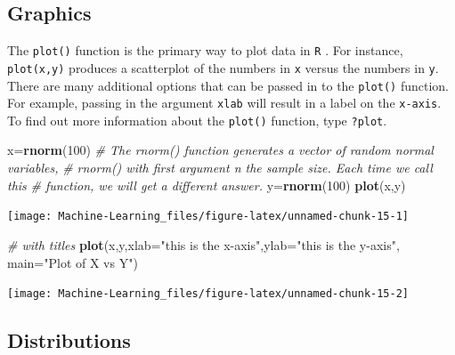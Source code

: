 \documentclass[]{book}
\newenvironment{Shaded}{\begin{snugshade}}{\end{snugshade}}
\newcommand{\KeywordTok}[1]{\textcolor[rgb]{0.13,0.29,0.53}{\textbf{{#1}}}}
\newcommand{\DataTypeTok}[1]{\textcolor[rgb]{0.13,0.29,0.53}{{#1}}}
\newcommand{\DecValTok}[1]{\textcolor[rgb]{0.00,0.00,0.81}{{#1}}}
\newcommand{\StringTok}[1]{\textcolor[rgb]{0.31,0.60,0.02}{{#1}}}
\newcommand{\CommentTok}[1]{\textcolor[rgb]{0.56,0.35,0.01}{\textit{{#1}}}}
\newcommand{\NormalTok}[1]{{#1}}
\begin{document}
\subsection{Graphics}\label{graphics}

The \texttt{plot()} function is the primary way to plot data in
\texttt{R} . For instance, \texttt{plot(x,y)} produces a scatterplot of
the numbers in \texttt{x} versus the numbers in \texttt{y}. There are
many additional options that can be passed in to the \texttt{plot()}
function. For example, passing in the argument \texttt{xlab} will result
in a label on the \texttt{x-axis}. To find out more information about
the \texttt{plot()} function, type \texttt{?plot}.

\begin{Shaded}
\begin{Highlighting}[]
\NormalTok{x=}\KeywordTok{rnorm}\NormalTok{(}\DecValTok{100}\NormalTok{)}
\CommentTok{# The rnorm() function generates a vector of random normal variables,}
\CommentTok{# rnorm() with first argument n the sample size. Each time we call this}
\CommentTok{# function, we will get a different answer.}
\NormalTok{y=}\KeywordTok{rnorm}\NormalTok{(}\DecValTok{100}\NormalTok{)}
\KeywordTok{plot}\NormalTok{(x,y)}
\end{Highlighting}
\end{Shaded}

\begin{center}\texttt{[image: Machine-Learning\_files/figure-latex/unnamed-chunk-15-1]} \end{center}

\begin{Shaded}
\begin{Highlighting}[]

\CommentTok{# with titles}
\KeywordTok{plot}\NormalTok{(x,y,}\DataTypeTok{xlab=}\StringTok{"this is the x-axis"}\NormalTok{,}\DataTypeTok{ylab=}\StringTok{"this is the y-axis"}\NormalTok{,}
\DataTypeTok{main=}\StringTok{"Plot of X vs Y"}\NormalTok{)}
\end{Highlighting}
\end{Shaded}

\begin{center}\texttt{[image: Machine-Learning\_files/figure-latex/unnamed-chunk-15-2]} \end{center}

\subsection{Distributions}\label{distributions}
\end{document}
